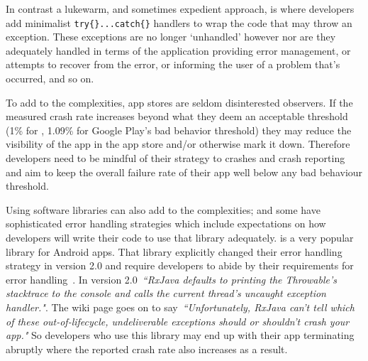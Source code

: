 In contrast a lukewarm, and sometimes expedient approach, is where developers add minimalist \texttt{try\{\}...catch\{\}} handlers to wrap the code that may throw an exception. These exceptions are no longer `unhandled' however nor are they adequately handled in terms of the application providing error management, or attempts to recover from the error, or informing the user of a problem that's occurred, and so on. %

To add to the complexities, app stores are seldom disinterested observers. If the measured crash rate increases beyond what they deem an acceptable threshold (1\% for  %
, 1.09\% for Google Play's bad behavior threshold) they may reduce the visibility of the app in the app store and/or otherwise mark it down. Therefore developers need to be mindful of their strategy to crashes and crash reporting and aim to keep the overall failure rate of their app well below any bad behaviour threshold.

Using software libraries can also add to the complexities; and some have sophisticated error handling strategies which include expectations on how developers will write their code to use that library adequately.  is a very popular library for Android apps. That library explicitly changed their error handling strategy in version 2.0 and require developers to abide by their requirements for error handling~. In version 2.0~\emph{``RxJava defaults to printing the Throwable's stacktrace to the console and calls the current thread's uncaught exception handler."}. The wiki page goes on to say~\emph{``Unfortunately, RxJava can't tell which of these out-of-lifecycle, undeliverable exceptions should or shouldn't crash your app."} So developers who use this library may end up with their app terminating abruptly where the reported crash rate also increases as a result.



